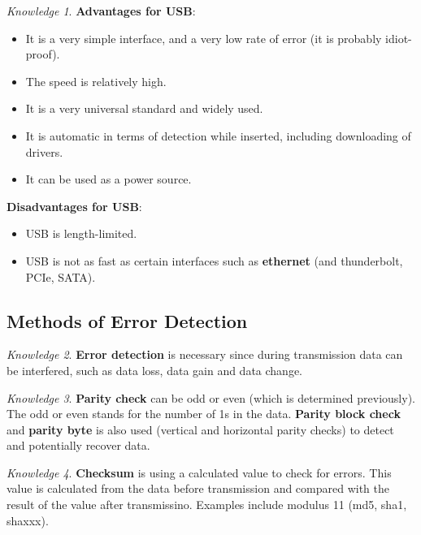 \documentclass[8pt]{article}
\theoremstyle{remark}
\newtheorem{knowledge}{Knowledge}[subsection]
\begin{document}
        \begin{knowledge}
            \textbf{Advantages for USB}:
            \begin{itemize}
                \item It is a very simple interface, and a very low rate of error (it is probably idiot-proof).
                \item The speed is relatively high.
                \item It is a very universal standard and widely used.
                \item It is automatic in terms of detection while inserted, including downloading of drivers.
                \item It can be used as a power source.
            \end{itemize}

            \textbf{Disadvantages for USB}:
            \begin{itemize}
                \item USB is length-limited.
                \item USB is not as fast as certain interfaces such as \textbf{ethernet} (and thunderbolt, PCIe, SATA).
            \end{itemize}
        \end{knowledge}

        \subsection{Methods of Error Detection}

        \begin{knowledge}
            \textbf{Error detection} is necessary since during transmission data can be interfered, such as data loss, data gain and data change.
        \end{knowledge}
        
        \begin{knowledge}
            \textbf{Parity check} can be odd or even (which is determined previously). The odd or even stands for the number of 1s in the data. \textbf{Parity block check} and \textbf{parity byte} is also used (vertical and horizontal parity checks) to detect and potentially recover data. 
        \end{knowledge}

        \begin{knowledge}
            \textbf{Checksum} is using a calculated value to check for errors. This value is calculated from the data before transmission and compared with the result of the value after transmissino. Examples include modulus 11 (md5, sha1, shaxxx).
        \end{knowledge}
\end{document}

